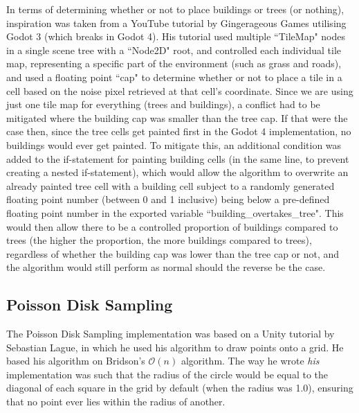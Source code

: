 In terms of determining whether or not to place buildings or trees (or nothing), inspiration was taken from a YouTube tutorial by Gingerageous Games utilising Godot 3\cite{gingergd3tutorialYT}\cite{gingergd3tutorialGH} (which breaks in Godot 4). His tutorial used multiple ``TileMap" nodes in a single scene tree with a ``Node2D" root, and controlled each individual tile map, representing a specific part of the environment (such as grass and roads), and used a floating point ``cap" to determine whether or not to place a tile in a cell based on the noise pixel retrieved at that cell's coordinate.\cite{gingergd3tutorialYT}\cite{gingergd3tutorialGH} Since we are using just one tile map for everything (trees and buildings), a conflict had to be mitigated where the building cap was smaller than the tree cap. If that were the case then, since the tree cells get painted first in the Godot 4 implementation, no buildings would ever get painted. To mitigate this, an additional condition was added to the if-statement for painting building cells (in the same line, to prevent creating a nested if-statement), which would allow the algorithm to overwrite an already painted tree cell with a building cell subject to a randomly generated floating point number (between 0 and 1 inclusive) being below a pre-defined floating point number in the exported variable ``building\_overtakes\_tree". This would then allow there to be a controlled proportion of buildings compared to trees (the higher the proportion, the more buildings compared to trees), regardless of whether the building cap was lower than the tree cap or not, and the algorithm would still perform as normal should the reverse be the case.   

\subsection{Poisson Disk Sampling}

The Poisson Disk Sampling implementation was based on a Unity tutorial by Sebastian Lague\cite{seblaguetuteYT}\cite{seblaguetuteGH}, in which he used his algorithm to draw points onto a grid. He based his algorithm on Bridson's $\mathcal{O}(n)$ algorithm.\cite{10.1145/1278780.1278807} The way he wrote \textit{his} implementation was such that the radius of the circle would be equal to the diagonal of each square in the grid by default (when the radius was 1.0), ensuring that no point ever lies within the radius of another.


